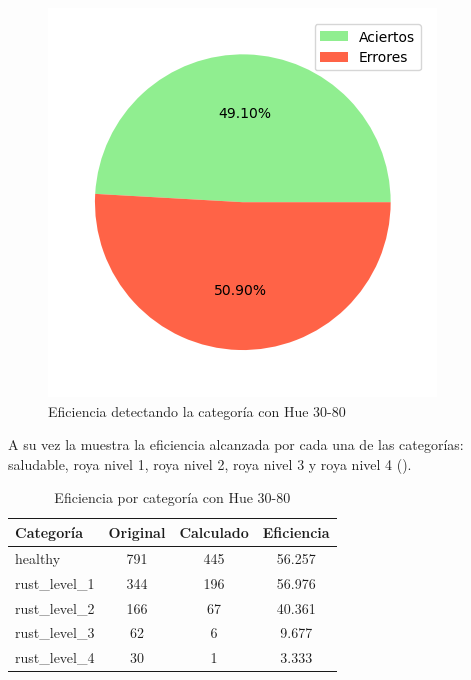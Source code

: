 \begin{figure}
\centering
\includegraphics[scale=0.6]{images/result_global_class_30_80.png}
\caption{Eficiencia detectando la categoría con Hue 30-80}
\label{img:efficiency_category_30_80}
\end{figure}

\captionsetup[figure]{skip=10pt}

A su vez la  muestra la eficiencia alcanzada por cada una de las categorías: saludable, roya nivel 1, roya nivel 2, roya nivel 3 y roya nivel 4 ().

\begin{table}[h!]
\centering
\begin{tabular}{|l|c|c|c|}
\hline 
\textbf{Categoría} & \textbf{Original} & \textbf{Calculado} & \textbf{Eficiencia} \\
\hline
healthy & 791 & 445 & 56.257 \\
\hline 
rust\_level\_1 & 344 & 196 & 56.976 \\
\hline 
rust\_level\_2 & 166 & 67 & 40.361 \\
\hline 
rust\_level\_3 & 62 & 6 & 9.677 \\
\hline 
rust\_level\_4 & 30 & 1 & 3.333 \\
\hline 
\end{tabular}
\caption{Eficiencia por categoría con Hue 30-80}
\label{table:efficiency_categories_30_80}
\end{table}

